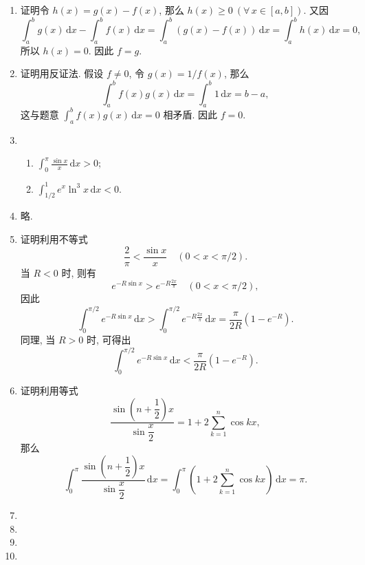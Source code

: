 \documentclass[a4paper, 11pt]{ctexart}
\newcommand{\dif}{\mathrm{d}}
\begin{document}
\begin{enumerate}
    \item %
        {\heiti 证明}\quad 令 $h(x) = g(x) - f(x)$, 那么 $h(x) \geqslant 0\ (\forall\,x \in [a, b])$. 又因
        \[
            \int_a^b g(x)\,\dif x - \int_a^b f(x)\,\dif x = \int_a^b (g(x) - f(x))\,\dif x = \int_a^b h(x)\,\dif x = 0,    
        \]
        所以 $h(x) = 0$. 因此 $f = g$.
    \item %
        {\heiti 证明}\quad 用反证法. 假设 $f \neq 0$, 令 $g(x) = 1/f(x)$, 那么
        \[
            \int_a^b f(x)g(x)\,\dif x = \int_a^b 1 \,\dif x = b - a,    
        \]
        这与题意 $\displaystyle{\int_a^b f(x)g(x)\,\dif x = 0}$ 相矛盾. 因此 $f = 0$.
    \item %
        \begin{enumerate}[(1)]
            \item %
                $\displaystyle{\int_0^\pi\frac{\sin x}{x}\,\dif x > 0}$;
            \item %
                $\displaystyle{\int_{1/2}^1 e^x\ln^3x\,\dif x < 0}$.
        \end{enumerate}
    \item %
        略.
    \item %
        {\heiti 证明}\quad 利用不等式
        \[
            \frac{2}{\pi} < \frac{\sin x}{x}\quad (0 < x < \pi/2).    
        \]
        当 $R < 0$ 时, 则有
        \[
            e^{-R\sin x} > e^{-R\frac{2x}{\pi}}\quad (0 < x < \pi/2),    
        \]
        因此
        \[
            \int_0^{\pi/2} e^{-R\sin x}\,\dif x > \int_0^{\pi/2} e^{-R\frac{2x}{\pi}}\,\dif x = \frac{\pi}{2R}(1 - e^{-R}).    
        \]
        同理, 当 $R > 0$ 时, 可得出
        \[
            \int_0^{\pi/2} e^{-R\sin x}\,\dif x < \frac{\pi}{2R}(1 - e^{-R}).    
        \]
    \item %
        {\heiti 证明}\quad 利用等式
        \[
            \frac{\sin\left(n+\dfrac12\right)x}{\sin\dfrac{x}{2}} = 1 + 2\sum_{k=1}^n\cos kx,
        \]
        那么
        \[
            \int_0^\pi\frac{\sin\left(n+\dfrac12\right)x}{\sin\dfrac{x}{2}}\,\dif x = \int_0^\pi \left(1 + 2\sum_{k=1}^n\cos kx\right)\,\dif x = \pi.    
        \]
    \item %
    \item %
    \item %
    \item %
\end{enumerate}
\end{document}
